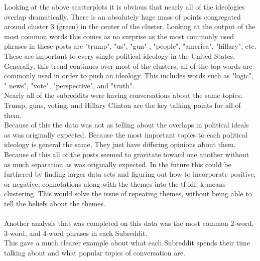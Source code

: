 \documentclass{article}
\begin{document}
\begin{addmargin}[4em]{4em}
Looking at the above scatterplots it is obvious that nearly all of the ideologies overlap dramatically. There is an absolutely huge mass of points congregated around cluster 3 (green) in the center of the cluster. Looking at the output of the most common words this comes as no surprise as the most commonly used phrases in these posts are "trump", "us", "gun" , "people", "america", "hillary", etc. These are important to every single political ideology in the United States. Generally, this trend continues over most of the clusters, all of the top words are commonly used in order to push an ideology. This includes words such as "logic", " news", "vote", "perspective", and "truth".  \\
Nearly all of the subreddits were having conversations about the same topics. Trump, guns, voting, and Hillary Clinton are the key talking points for all of them. \\
Because of this the data was not as telling about the overlaps in political ideals as was originally expected. Because the most important topics to each political ideology is general the same, They just have differing opinions about them. Because of this all of the posts seemed to gravitate toward one another without as much separation as was originally expected. In the future this could be furthered by finding larger data sets and figuring out how to incorporate positive, or negative, connotations along with the themes into the tf-idf, k-means clustering. This would solve the issue of repeating themes, without being able to tell the beliefs about the themes.\\\\
Another analysis that was completed on this data was the most common 2-word, 3-word, and 4-word phrases in each Subreddit.\\
This gave a much clearer example about what each Subreddit spends their time talking about and what popular topics of conversation are.\\

\end{addmargin}
\end{document}
